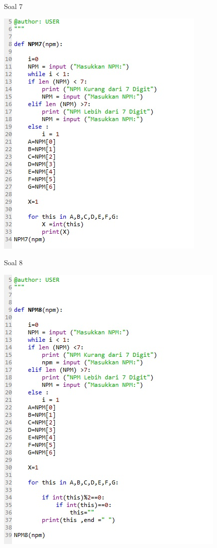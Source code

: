 \documentclass[a4paper,12pt]{report}
\begin{document}
\item Soal 7
    \begin{center}
    \includegraphics[width=11cm\textwidth]{Ketrampilan/7.jpg}
    \end{center}
\item Soal 8
    \begin{center}
    \includegraphics[width=11cm\textwidth]{Ketrampilan/8.jpg}
    \end{center}
\end{document}
